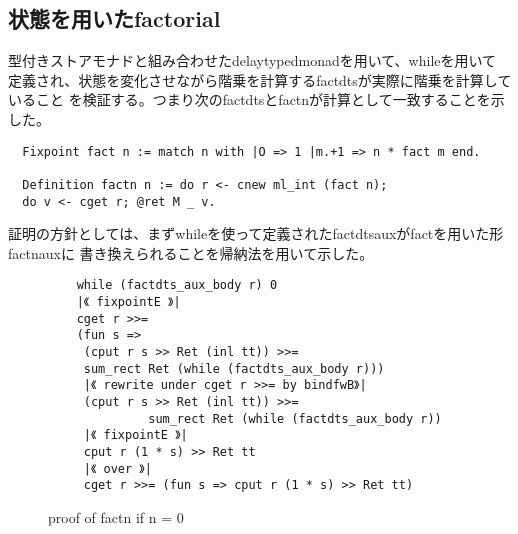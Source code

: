 \documentclass[japanese]{jssst_ppl}
\theoremstyle{definition}
\begin{document}
\iffalse
  \begin{verbatim}
    mc91 n m
   |《 definition of mc91 》|

   | \scalebox{0.8}{$\approx$} | while (fun nm : nat * nat =>
    let (n0, m0) := nm in if n0 == 0 then Ret (inl m0)
                                     else if 100 < m0
                                          then Ret (inr (n0.-1, m0 - 10))
                                          else Ret (inr (n0.+1, m0 + 11))) (n.+1, m)
   |《 fixpointE 》|
   | \scalebox{0.8}{$\approx$} | (if 100 < m then Ret (inr (n, m - 10))
                else Ret (inr (n.+2, m + 11))) >>= sum_rect (fun=> M nat) Ret (while mc91_body)
   |《 $m < 101$ 》|
    |\scalebox{0.8}{$\approx$}| Ret (inr (n.+2, m + 11)) >>= sum_rect (fun=> M nat) Ret (while mc91_body)
   |《 Monad law: Ret a >>= f = f a 》|
    |\scalebox{0.8}{$\approx$}| while mc91_body (n.+2, m + 1)
   |《 definition of mc91,fixpointE 》|
    |\scalebox{0.8}{$\approx$}| (if 100 < m + 11
        then Ret (inr (n.+1, m + 11 - 10))
        else Ret (inr (n.+3, m + 11 + 11))) >>= sum_rect (fun=> M nat) Ret (while mc91_body)
   |《 $90 \leq m \implies 100 < m + 11$, Monad law  》|
    |\scalebox{0.8}{$\approx$}|  while mc91_body (n.+1, m + 11 - 10) = mc91 n (m+1)

      \end{verbatim}

\fi

\subsection{状態を用いたfactorial}
型付きストアモナドと組み合わせたdelaytypedmonadを用いて、whileを用いて
定義され、状態を変化させながら階乗を計算するfactdtsが実際に階乗を計算していること
を検証する。つまり次のfactdtsとfactnが計算として一致することを示した。

\begin{verbatim}
  Fixpoint fact n := match n with |O => 1 |m.+1 => n * fact m end.

  Definition factn n := do r <- cnew ml_int (fact n);
  do v <- cget r; @ret M _ v.
\end{verbatim}

証明の方針としては、まずwhileを使って定義されたfactdtsauxがfactを用いた形factnauxに
書き換えられることを帰納法を用いて示した。


\begin{figure}
  \centering
  \begin{verbatim}
    while (factdts_aux_body r) 0
    |《 fixpointE 》|
    cget r >>=
    (fun s =>
     (cput r s >> Ret (inl tt)) >>=
     sum_rect Ret (while (factdts_aux_body r)))
     |《 rewrite under cget r >>= by bindfwB》|
     (cput r s >> Ret (inl tt)) >>=
              sum_rect Ret (while (factdts_aux_body r))
     |《 fixpointE 》|
     cput r (1 * s) >> Ret tt
     |《 over 》|
     cget r >>= (fun s => cput r (1 * s) >> Ret tt)
    \end{verbatim}

  \iffalse
  \fi
  \caption{proof of factn if n =  0 }
\end{figure}
\end{document}
